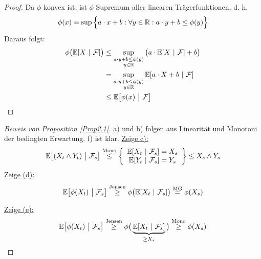 \begin{proof}
	Da $\phi$ konvex ist, ist $\phi$ Supremum aller linearen Trägerfunktionen, d. h.
	\begin{align*}
		\phi(x)=\sup\Big\lbrace a\cdot x+b:\forall y\in \mathbb{R}: a\cdot y+b\leq\phi(y)\Big\rbrace
	\end{align*}
	Daraus folgt:
	\begin{align*}
		\phi\big(\mathbb{E}[X~|~\mathcal{F}]\big)
		&\leq\sup\limits_{\begin{subarray}{c}a\cdot y+b\leq\phi(y)\\y\in\mathbb{R}\end{subarray}}\big(a\cdot\mathbb{E}[X~|~\mathcal{F}]+b\big) \\
		&=\sup\limits_{\begin{subarray}{c}a\cdot y+b\leq\phi(y)\\y\in\mathbb{R}\end{subarray}}
		\mathbb{E}[a\cdot X+b~|~\mathcal{F}] \\
		&\leq \mathbb{E}\big[\phi(x)~\big|~\mathcal{F}\big]
	\end{align*}
\end{proof}

\begin{proof}[Beweis von Proposition \ref{Prop2.1}]
	a) und b) folgen aus Linearität und Monotoni der bedingten Erwartung. f) ist klar.\nl
	\underline{Zeige c):}
	\begin{align*}
		\mathbb{E}\big[(X_t\wedge Y_t)~\big|~\mathcal{F}_s\big]
		\stackrel{\text{Mono}}{\leq}
		\left\lbrace\begin{array}{c}
		\mathbb{E}[X_t~|~\mathcal{F}_s]=X_s\\
		\mathbb{E}[Y_t~|~\mathcal{F}_s]=Y_s\\
		\end{array}\right\rbrace
		\leq X_s\wedge Y_s
	\end{align*}
	\underline{Zeige (d):}
	\begin{align*}
		\mathbb{E}\big[\phi(X_t)~\big|~\mathcal{F}_s\big]
		\stackrel{\text{Jensen}}{\geq}
		\phi\big(\mathbb{E}[X_t~|~\mathcal{F}_s]\big)
		\stackrel{\text{MG}}{=}
		\phi(X_s)
	\end{align*}

	\underline{Zeige (e):}
	\begin{align*}
		\mathbb{E}\big[\phi(X_t)~\big|~\mathcal{F}_s\big]
		\stackrel{\text{Jensen}}{\geq}
		\phi\big(\underbrace{\mathbb{E}[X_t~|~\mathcal{F}_s]}_{\geq X_s}\big)
		\stackrel{\text{Mono}}{\geq}
		\phi(X_s)
	\end{align*}
\end{proof}

